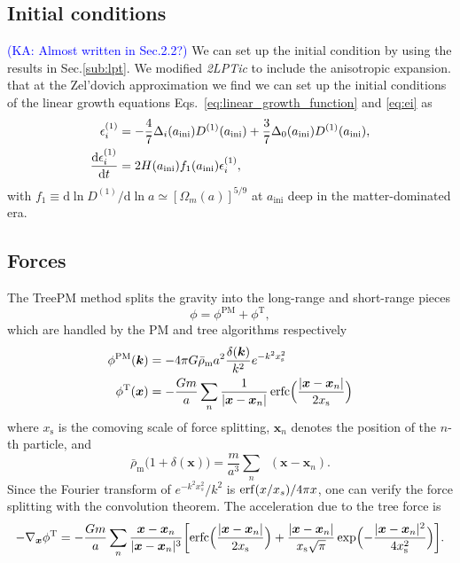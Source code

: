 \documentclass[a4paper,11pt]{article}
\DeclareMathOperator{\deltaD}{\delta^\mathrm{D}}
\DeclareMathOperator{\erfc}{erfc}
\renewcommand{\d}{\mathrm{d}}
\newcommand{\vx}{{\bm x}}
\newcommand{\vk}{{\bm k}}
\newcommand{\rhobarm}{{\bar\rho_\mathrm{m}}}
\newcommand{\Tree}{\mathrm{T}}
\newcommand{\PM}{\mathrm{PM}}
\newcommand{\xs}{x_\mathrm{s}}
\newcommand{\KA}[1]{\textcolor{Blue}{(KA: #1)}}
\begin{document}
\subsection{Initial conditions}
\label{sub:ics}

\KA{Almost written in Sec.2.2?}
We can set up the initial condition by using the results in Sec.\ref{sub:lpt}.
We modified \textit{2LPTic} to include the anisotropic expansion.
that at the Zel'dovich approximation we find
we can set up the initial conditions of the linear growth equations
Eqs.~\eqref{eq:linear_growth_function} and \eqref{eq:ei} as
\begin{align}
    \epsilon^{(1)}_i &=
    -\frac47 \Delta_i(a_\mathrm{ini}) D^{(1)}(a_\mathrm{ini}) + \frac37 \Delta_0(a_\mathrm{ini}) D^{(1)}(a_\mathrm{ini}),
    \nonumber\\
    \frac{\d \epsilon^{(1)}_i}{\d t} &= 2 H(a_{\rm ini})f_1(a_{\rm ini})\epsilon^{(1)}_i,
    \label{eq:ICs_ZA}
\end{align}
with $f_1\equiv \d \ln D^{(1)}/\d \ln a \simeq [\Omega_m(a)]^{5/9}$
at $a_\mathrm{ini}$ deep in the matter-dominated era.
\subsection{Forces}
\label{sub:treepm}

The TreePM method splits the gravity into the long-range and short-range pieces
\begin{equation}
    \phi = \phi^\PM + \phi^\Tree,
\end{equation}
which are handled by the PM and tree algorithms respectively \cite{Bagla02,
BaglaRay03}
\begin{align}
    \phi^\PM(\vk) &= - 4\pi G \rhobarm a^2
        \frac{\delta(\vk)}{k^2} e^{- k^2 \xs^2} \\
    \phi^\Tree(\vx) &= - \frac{G m}a \sum_n \frac1{|\vx-\vx_n|}
    \erfc \Bigl( \frac{|\vx-\vx_n|}{2 \xs} \Bigr)
\end{align}
where $\xs$ is the comoving scale of force splitting,
$\vx_n$ denotes the position of the $n$-th particle,
and
\begin{equation}
    \rhobarm \bigl( 1 + \delta(\vx) \bigr)
    = \frac{m}{a^3} \sum_n \deltaD(\vx-\vx_n).
\end{equation}
Since the Fourier transform of $e^{- k^2 x_s^2} / k^2$ is ${\rm erf}(x / x_s) / 4\pi x$,
one can verify the force splitting with the convolution theorem.
The acceleration due to the tree force is
\begin{equation}
    - \nabla_\vx \phi^\Tree = - \frac{G m}a \sum_n
    \frac{\vx - \vx_n}{|\vx - \vx_n|^3}
    \biggl[ \erfc \Bigl( \frac{|\vx - \vx_n|}{2 \xs} \Bigr)
            + \frac{|\vx - \vx_n|}{\xs \sqrt\pi}
            \exp \Bigl( - \frac{|\vx - \vx_n|^2}{4 \xs^2} \Bigr) \biggr].
\end{equation}
\end{document}
